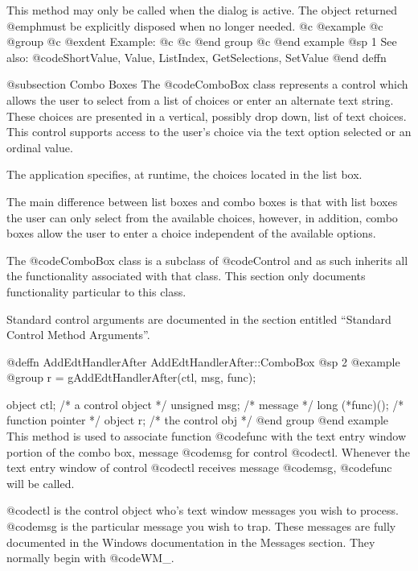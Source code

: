 This method may only be called when the dialog is active.  The object
returned @emph{must} be explicitly disposed when no longer needed.
@c @example
@c @group
@c @exdent Example:
@c 
@c @end group
@c @end example
@sp 1
See also:  @code{ShortValue, Value, ListIndex, GetSelections, SetValue}
@end deffn








@subsection Combo Boxes
The @code{ComboBox} class represents a control which allows the user to
select from a list of choices or enter an alternate text string.  These
choices are presented in a vertical, possibly drop down, list of text
choices.  This control supports access to the user's choice via the text
option selected or an ordinal value.

The application specifies, at runtime, the choices located in the list box.

The main difference between list boxes and combo boxes is that with list
boxes the user can only select from the available choices, however, in
addition, combo boxes allow the user to enter a choice independent of
the available options.

The @code{ComboBox} class is a subclass of @code{Control} and as such
inherits all the functionality associated with that class.  This section
only documents functionality particular to this class.

Standard control arguments are documented in the section entitled
``Standard Control Method Arguments''.










@deffn {AddEdtHandlerAfter} AddEdtHandlerAfter::ComboBox
@sp 2
@example
@group
r = gAddEdtHandlerAfter(ctl, msg, func);

object   ctl;      /*  a control object  */
unsigned msg;      /*  message           */
long    (*func)(); /*  function pointer  */
object  r;         /*  the control obj   */
@end group
@end example
This method is used to associate function @code{func} with the text
entry window portion of the combo box, message @code{msg} for
control @code{ctl}.  Whenever the text entry window of control
@code{ctl} receives message @code{msg}, @code{func} will be called.

@code{ctl} is the control object who's text window messages you wish to
process.  @code{msg} is the particular message you wish to trap.  These
messages are fully documented in the Windows documentation in the
Messages section.  They normally begin with @code{WM_}.

